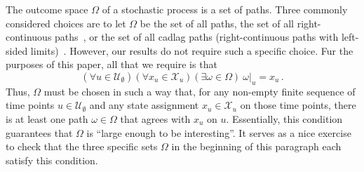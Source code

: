 \documentclass[10pt,a4paper]{paper}
\theoremstyle{definition}
\newcommand{\states}{\mathcal{X}}
\begin{document}
The outcome space $\Omega$ of a stochastic process is a set of paths. Three commonly considered choices are to let $\Omega$ be the set of all paths, the set of all right-continuous paths~\cite{norris1998markov}, or the set of all cadlag paths (right-continuous paths with left-sided limits)~\cite{williams2000}. However, our results do not require such a specific choice. Fur the purposes of this paper, all that we require is that
\begin{equation}\label{eq:path_exists_for_finite_points}
(\forall u\in\mathcal{U}_\emptyset)(\forall x_u\in\states_u)(\exists \omega\in\Omega)~\omega\vert_u=x_u\,.
\end{equation}
Thus, $\Omega$ must be chosen in such a way that, for any non-empty finite sequence of time points $u\in\mathcal{U}_\emptyset$ and any state assignment $x_u\in\states_u$ on those time points, there is at least one path $\omega\in\Omega$ that agrees with $x_u$ on $u$. Essentially, 
this condition
guarantees that $\Omega$ is ``large enough to be interesting''. It serves as a nice exercise to check that the three specific sets $\Omega$ in the beginning of this paragraph each satisfy this condition.
\end{document}
